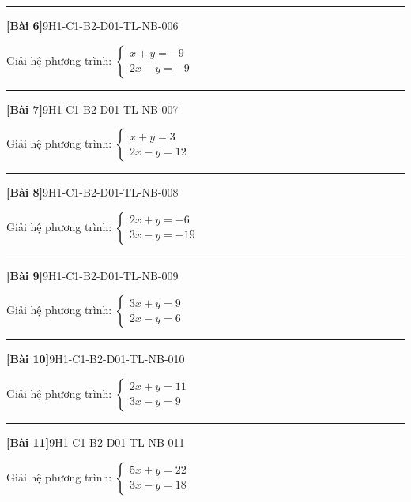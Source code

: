\documentclass[12pt,a4paper]{article}
\newif\ifloigiai
\newenvironment{cauhoi}[2]{%
  \par\medskip\noindent\rule{\textwidth}{0.4pt}\par\nopagebreak
  \noindent\textbf{[#1]}\hfill{\scriptsize\ttfamily #2}\par\nopagebreak\smallskip}{\par}
\newcommand{\loigiai}[1]{\ifloigiai\par\smallskip\noindent\textit{Lời giải.} #1\par\fi}
\begin{document}
\begin{cauhoi}{Bài 6}{9H1-C1-B2-D01-TL-NB-006}
Giải hệ phương trình: $\begin{cases}x + y=-9\\ 2x - y=-9\end{cases}$
\loigiai{Cộng từng vế hai phương trình ta được $3x=-18$, suy ra $x=-6$. Thay vào phương trình thứ nhất: $1\cdot(-6)+y=-9$, suy ra $y=-3$. Vậy hệ có nghiệm $(x;y)=(-6;-3)$.}
\end{cauhoi}
\begin{cauhoi}{Bài 7}{9H1-C1-B2-D01-TL-NB-007}
Giải hệ phương trình: $\begin{cases}x + y=3\\ 2x - y=12\end{cases}$
\loigiai{Cộng từng vế hai phương trình ta được $3x=15$, suy ra $x=5$. Thay vào phương trình thứ nhất: $1\cdot(5)+y=3$, suy ra $y=-2$. Vậy hệ có nghiệm $(x;y)=(5;-2)$.}
\end{cauhoi}
\begin{cauhoi}{Bài 8}{9H1-C1-B2-D01-TL-NB-008}
Giải hệ phương trình: $\begin{cases}2x + y=-6\\ 3x - y=-19\end{cases}$
\loigiai{Cộng từng vế hai phương trình ta được $5x=-25$, suy ra $x=-5$. Thay vào phương trình thứ nhất: $2\cdot(-5)+y=-6$, suy ra $y=4$. Vậy hệ có nghiệm $(x;y)=(-5;4)$.}
\end{cauhoi}
\begin{cauhoi}{Bài 9}{9H1-C1-B2-D01-TL-NB-009}
Giải hệ phương trình: $\begin{cases}3x + y=9\\ 2x - y=6\end{cases}$
\loigiai{Cộng từng vế hai phương trình ta được $5x=15$, suy ra $x=3$. Thay vào phương trình thứ nhất: $3\cdot(3)+y=9$, suy ra $y=0$. Vậy hệ có nghiệm $(x;y)=(3;0)$.}
\end{cauhoi}
\begin{cauhoi}{Bài 10}{9H1-C1-B2-D01-TL-NB-010}
Giải hệ phương trình: $\begin{cases}2x + y=11\\ 3x - y=9\end{cases}$
\loigiai{Cộng từng vế hai phương trình ta được $5x=20$, suy ra $x=4$. Thay vào phương trình thứ nhất: $2\cdot(4)+y=11$, suy ra $y=3$. Vậy hệ có nghiệm $(x;y)=(4;3)$.}
\end{cauhoi}
\begin{cauhoi}{Bài 11}{9H1-C1-B2-D01-TL-NB-011}
Giải hệ phương trình: $\begin{cases}5x + y=22\\ 3x - y=18\end{cases}$
\loigiai{Cộng từng vế hai phương trình ta được $8x=40$, suy ra $x=5$. Thay vào phương trình thứ nhất: $5\cdot(5)+y=22$, suy ra $y=-3$. Vậy hệ có nghiệm $(x;y)=(5;-3)$.}
\end{cauhoi}
\end{document}

